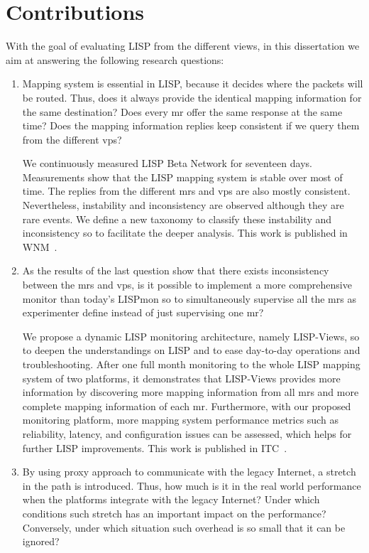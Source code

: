 \section{Contributions}
\label{sec:intro_contributions}
With the goal of evaluating LISP from the different views, in this dissertation we aim at answering the following research questions:
\begin{enumerate}[noitemsep,topsep=0pt]
	\item Mapping system is essential in LISP, because it decides where the packets will be routed. Thus, does it always provide the identical mapping information for the same destination? Does every \acrshort{mr} offer the same response at the same time? Does the mapping information replies keep consistent if we query them from the different \acrfull{vp}s?
	
	We continuously measured LISP Beta Network for seventeen days. Measurements show that the LISP mapping system is stable over most of time. The replies from the different \acrshort{mr}s and \acrshort{vp}s are also mostly consistent. Nevertheless, instability and inconsistency are observed although they are rare events. We define a new taxonomy to classify these instability and inconsistency so to facilitate the deeper analysis. This work is published in WNM~\cite{yue2016stability}.
	
	\item As the results of the last question show that there exists inconsistency between the \acrshort{mr}s and \acrshort{vp}s, is it possible to implement a more comprehensive monitor than today's LISPmon so to simultaneously supervise all the \acrshort{mr}s as experimenter define instead of just supervising one \acrshort{mr}?
	
	We propose a dynamic LISP monitoring architecture, namely LISP-Views, so to deepen the understandings on LISP and to ease day-to-day operations and troubleshooting. After one full month monitoring to the whole LISP mapping system of two platforms, it demonstrates that LISP-Views provides more information by discovering more mapping information from all \acrshort{mr}s and more complete mapping information of each \acrshort{mr}. Furthermore, with our proposed monitoring platform, more mapping system performance metrics such as reliability, latency, and configuration issues can be assessed, which helps for further LISP improvements. This work is published in ITC~\cite{li2017lisp}.
	
	\item By using proxy approach to communicate with the legacy Internet, a stretch in the path is introduced. Thus, how much is it in the real world performance when the platforms integrate with the legacy Internet? Under which conditions such stretch has an important impact on the performance? Conversely, under which situation such overhead is so small that it can be ignored? 
	

\end{enumerate}
